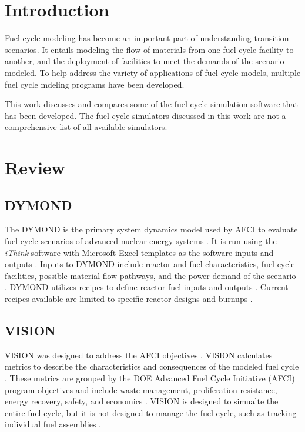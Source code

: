 \documentclass{article}
\begin{document}
    \section{Introduction}
    Fuel cycle modeling has become an important part of understanding 
    transition scenarios. It entails modeling the flow of materials 
    from one fuel cycle facility to another, and the deployment of 
    facilities to meet the demands of the scenario modeled. 
    To help address the variety of applications 
    of fuel cycle models, multiple fuel cycle mdeling programs have 
    been developed. 

    This work discusses and compares some of the fuel cycle simulation 
    software that has been developed. The fuel cycle simulators 
    discussed in this work are not a comprehensive list of all available 
    simulators. 
    

    \section{Review}
    
    
    \subsection{DYMOND}
    The \gls{DYMOND} is the primary 
    system dynamics model used by AFCI to evaluate fuel cycle scenarios of 
    advanced nuclear energy systems \cite{yacout_visionverifiable_2006}.
    It is run using the \textit{iThink} software with Microsoft Excel 
    templates as the software inputs and outputs \cite{feng_standardized_2016}.
    Inputs to DYMOND include reactor and fuel characteristics, fuel cycle
    facilities, possible material flow pathways, and the power demand of the 
    scenario \cite{feng_standardized_2016}. 
    \gls{DYMOND} utilizes recipes to define reactor fuel inputs and outputs 
    \cite{yacout_visionverifiable_2006}. Current recipes available are limited 
    to specific reactor designs and burnups \cite{yacout_visionverifiable_2006}.




    \subsection{VISION}
    \Ac{VISION} was designed to address the AFCI objectives \cite{yacout_visionverifiable_2006}.
    \Ac{VISION} calculates metrics to describe the characteristics and 
    consequences of the modeled fuel cycle \cite{yacout_visionverifiable_2006}. 
    These metrics are grouped by the 
    \gls{DOE} Advanced Fuel Cycle Initiative (AFCI) program objectives and include 
    waste management, proliferation 
    resistance, energy recovery, safety, and economics 
    \cite{yacout_visionverifiable_2006}. \gls{VISION} is designed to simualte the 
    entire fuel cycle, but it is not designed to manage the fuel cycle, such 
    as tracking individual fuel assemblies \cite{yacout_visionverifiable_2006}.
\end{document}
